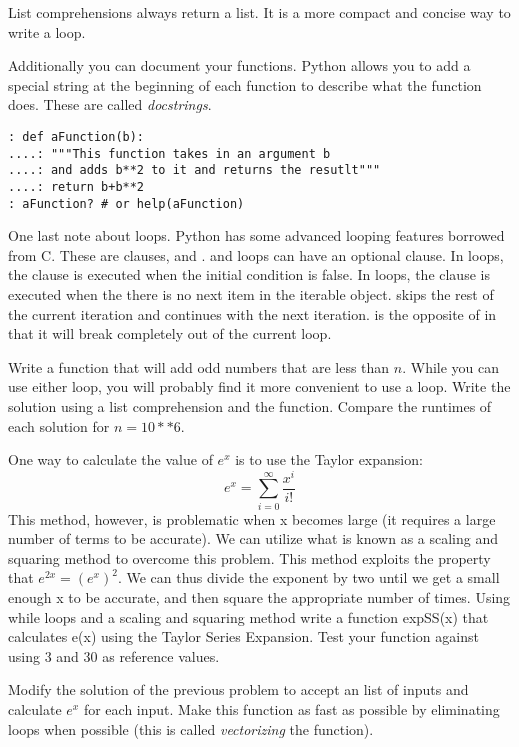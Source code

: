 List comprehensions always return a list.  It is a more compact and concise  way to write a  loop.

Additionally you can document your functions. Python allows you to add a special string at the beginning of each function to describe what the function does.  These are called \emph{docstrings}.
\begin{lstlisting}[style=python]
: def aFunction(b):
....: """This function takes in an argument b
....: and adds b**2 to it and returns the resutlt"""
....: return b+b**2
: aFunction? # or help(aFunction)
\end{lstlisting}

One last note about loops.  Python has some advanced looping features borrowed from C.  These are  clauses,  and .   and  loops can have an optional  clause.  In  loops, the  clause is executed when the initial condition is false.  In  loops, the  clause is executed when the there is no next item in the iterable object.   skips the rest of the current iteration and continues with the next iteration.   is the opposite of  in that it will break completely out of the current loop.

\begin{problem}
Write a function that will add odd numbers that are less than $n$. While you can use either loop, you will probably find it more convenient to use a  loop. Write the solution using a list comprehension and the  function. Compare the runtimes of each solution for $n=10**6$.
\end{problem}



\begin{problem}
One way to calculate the value of $e^x$ is to use the Taylor expansion:
\[
e^x = \sum_{i=0}^\infty{\frac{x^i}{i!}}
\]
This method, however, is problematic when x becomes large (it requires a large number of terms to be accurate). We can utilize what is known as a scaling and squaring method to overcome this problem. This method exploits the property that $e^{2x} = (e^x)^2$. We can thus divide the exponent by two until we get a small enough x to be accurate, and then square the appropriate number of times.
Using while loops and a scaling and squaring method write a function expSS(x) that calculates e(x) using the Taylor Series Expansion. Test your function against  using $3$ and $30$ as reference values.
\end{problem}

\begin{problem}
Modify the solution of the previous problem to accept an list of inputs and calculate $e^x$ for each input. Make this function as fast as possible by eliminating loops when possible (this is called \emph{vectorizing} the function).
\end{problem}